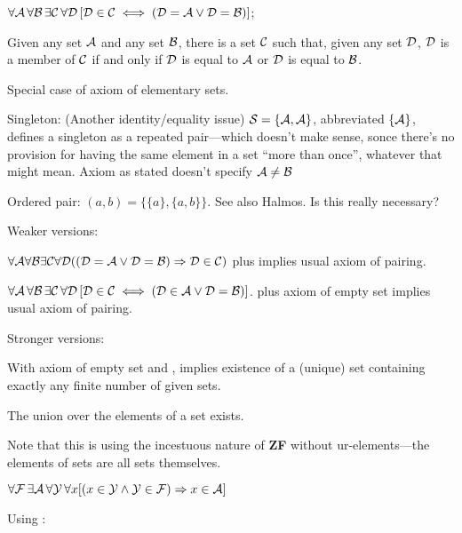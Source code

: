 $\forall \mathcal{A}\,\forall \mathcal{B}\,\exists \mathcal{C}\,\forall \mathcal{D}\,
[\mathcal{D}\in \mathcal{C}\iff (\mathcal{D}=\mathcal{A}\lor \mathcal{D}=\mathcal{B})]$;

Given any set $\mathcal{A}$ and any set $\mathcal{B}$, 
there is a set $\mathcal{C}$ such that, 
given any set $\mathcal{D}$, 
$\mathcal{D}$ is a member of $\mathcal{C}$ 
if and only if 
$\mathcal{D}$ is equal to $\mathcal{A}$ 
or 
$\mathcal{D}$ is equal to $\mathcal{B}$.

Special case of axiom of elementary 
sets\cite{wiki:Zermelo_set_theory}.

Singleton:
(Another identity/equality issue)
$\mathcal{S}=\{\mathcal{A},\mathcal{A}\}$, abbreviated $\{\mathcal{A}\}$,
defines a singleton as a repeated pair---which doesn't make sense,
sonce there's no provision for having the same element
in a set ``more than once'', whatever that might mean.
Axiom as stated doesn't specify $\mathcal{A} \neq \mathcal{B}$

Ordered pair:
$(a,b)=\{\{a\},\{a,b\}\}$.
See also Halmos\cite{Halmos1960Naive}.
Is this really necessary? 

Weaker versions:
 
${\displaystyle 
\forall \mathcal{A} \forall \mathcal{B} 
\exists \mathcal{C}
\forall \mathcal{D}((\mathcal{D}=\mathcal{A}\lor \mathcal{D}=\mathcal{B}) \Rightarrow \mathcal{D}\in \mathcal{C})}$
plus 
implies usual axiom of pairing.

${\displaystyle 
\forall \mathcal{A}\,\forall \mathcal{B}\,
\exists \mathcal{C}\,
\forall \mathcal{D}\,[\mathcal{D}\in \mathcal{C}
\iff (\mathcal{D}\in \mathcal{A}\lor \mathcal{D}=\mathcal{B})]}$.
plus 
axiom of empty set
implies usual axiom of pairing.

Stronger versions:

With axiom of empty set\cite{wiki:Axiom_of_empty_set} 
and ,
implies existence of a (unique) set containing exactly
any finite number of given sets.

\label{sec:Axiom-of-union}

The union over the elements of a set 
exists\cite{wiki:Axiom_of_union}.

Note that this is using the incestuous nature of 
\textbf{ZF} without ur-elements---the elements of sets
are all sets themselves. 
 
$\forall {\ensuremath{\mathcal{F}}}\,
\exists \mathcal{A}\,
\forall \mathcal{Y}\,\forall x
[(x\in \mathcal{Y} \land \mathcal{Y}\in \mathcal{F})
\Rightarrow x\in \mathcal{A}]$

Using :


